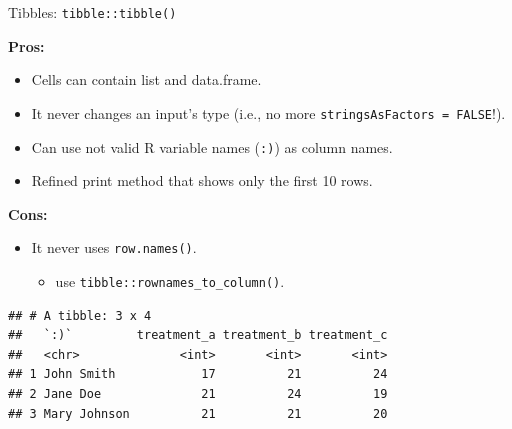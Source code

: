 \documentclass[14pt,ignorenonframetext,]{bredelebeamer}
\newenvironment{Shaded}{\begin{snugshade}}{\end{snugshade}}
\newcommand{\KeywordTok}[1]{\textcolor[rgb]{0.94,0.87,0.69}{#1}}
\newcommand{\DataTypeTok}[1]{\textcolor[rgb]{0.87,0.87,0.75}{#1}}
\newcommand{\StringTok}[1]{\textcolor[rgb]{0.80,0.58,0.58}{#1}}
\newcommand{\OperatorTok}[1]{\textcolor[rgb]{0.94,0.94,0.82}{#1}}
\newcommand{\NormalTok}[1]{\textcolor[rgb]{0.80,0.80,0.80}{#1}}
\providecommand{\tightlist}{%
  \setlength{\itemsep}{0pt}\setlength{\parskip}{0pt}}
\begin{document}
\begin{frame}[fragile]{Tibbles: \texttt{tibble::tibble()}}

\textbf{Pros: }

\begin{itemize}
\tightlist
\item
  Cells can contain list and data.frame.
\item
  It never changes an input's type (i.e., no more
  \texttt{stringsAsFactors\ =\ FALSE}!).
\item
  Can use not valid R variable names (\texttt{:)}) as column names.
\item
  Refined print method that shows only the first 10 rows.
\end{itemize}

\textbf{Cons: }

\begin{itemize}
\tightlist
\item
  It never uses \texttt{row.names()}.

  \begin{itemize}
  \tightlist
  \item
    use \texttt{tibble::rownames\_to\_column()}.
  \end{itemize}
\end{itemize}

\begin{Shaded}
\end{Shaded}

\begin{verbatim}
## # A tibble: 3 x 4
##   `:)`         treatment_a treatment_b treatment_c
##   <chr>              <int>       <int>       <int>
## 1 John Smith            17          21          24
## 2 Jane Doe              21          24          19
## 3 Mary Johnson          21          21          20
\end{verbatim}

\end{frame}
\end{document}
